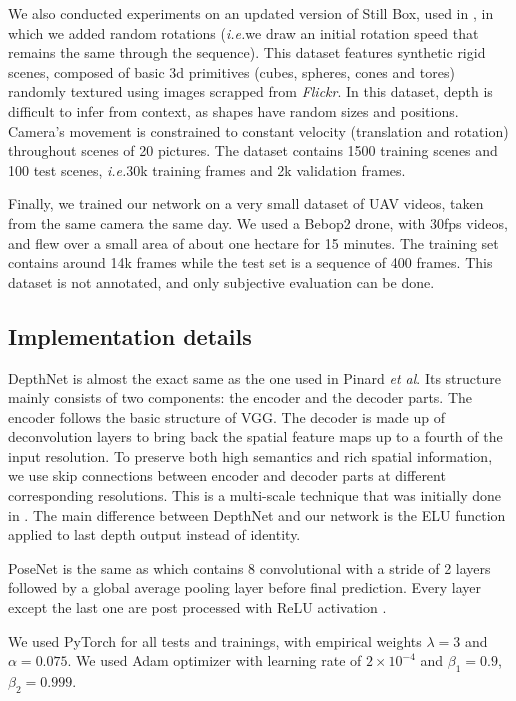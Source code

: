 \documentclass[runningheads]{llncs}
\def\etal{\emph{et al}\:}
\def\ie{\emph{i.e.}\:}
\begin{document}
We also conducted experiments on an updated version of Still Box, used in \cite{isprs-annals-IV-2-W3-67-2017}, in which we added random rotations
(\ie we draw an initial rotation speed that remains the same through the sequence).
This dataset features synthetic rigid scenes, composed of basic 3d primitives (cubes, spheres, cones and tores) randomly textured using images scrapped from \textit{Flickr}. In this dataset, depth is difficult to infer from context, as shapes have random sizes and positions. Camera's movement is constrained to constant velocity (translation and rotation) throughout scenes of 20 pictures.
The dataset contains 1500 training scenes and 100 test scenes, \ie 30k training frames and 2k validation frames.

Finally, we trained our network on a very small dataset of UAV videos, taken from the same camera the same day. We used a Bebop2 drone, with 30fps videos, and flew over a small area of about one hectare for 15 minutes.
The training set contains around 14k frames while the test set is a sequence of 400 frames. This dataset is not annotated, and only subjective evaluation can be done.

\subsection{Implementation details}
DepthNet is almost the exact same as the one used in Pinard \etal \cite{isprs-annals-IV-2-W3-67-2017}. Its structure mainly consists of two components: the encoder and the decoder parts. The encoder follows the basic structure of VGG\cite{Simonyan14c}. The decoder is made up of deconvolution layers to bring back the spatial feature maps up to a fourth of the input resolution.
To preserve both high semantics and rich spatial information, we use skip connections between encoder and decoder parts at different corresponding resolutions. This is a multi-scale technique that was initially done in \cite{DFIB15}.
The main difference between DepthNet and our network is the ELU function \cite{clevert2015fast} applied to last depth output instead of identity.

PoseNet is the same as
\cite{zhou2017unsupervised} which contains 8 convolutional with a stride of 2 layers followed by a global average pooling layer before final prediction. Every layer except the last one are post processed with ReLU activation \cite{nair2010rectified}.

We used PyTorch \cite{paszke2017automatic} for all tests and trainings, with empirical weights $\lambda = 3$ and $\alpha = 0.075$. We used Adam optimizer \cite{DBLP:journals/corr/KingmaB14} with learning rate of
$2 \times 10^{-4}$
and $\beta_1 = 0.9$, $\beta_2 = 0.999$.
\end{document}
